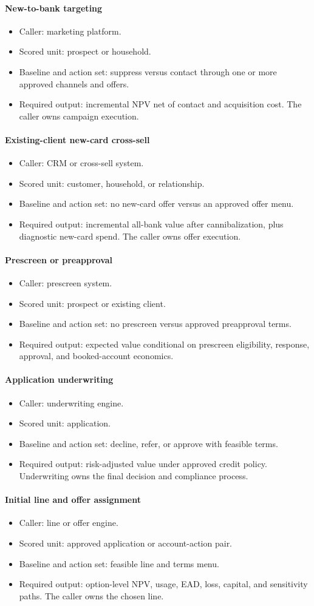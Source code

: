 \documentclass[11pt]{article}
\newcommand{\1}{\mathbf{1}}
\newcommand{\contractitem}[2]{\paragraph{#1}\begin{itemize}[leftmargin=1.5em,itemsep=0.12em,topsep=0.18em]#2\end{itemize}}
\begin{document}
\contractitem{New-to-bank targeting}{
  \item Caller: marketing platform.
  \item Scored unit: prospect or household.
  \item Baseline and action set: suppress versus contact through one or more
        approved channels and offers.
  \item Required output: incremental NPV net of contact and acquisition cost.
        The caller owns campaign execution.
}
\contractitem{Existing-client new-card cross-sell}{
  \item Caller: CRM or cross-sell system.
  \item Scored unit: customer, household, or relationship.
  \item Baseline and action set: no new-card offer versus an approved offer
        menu.
  \item Required output: incremental all-bank value after cannibalization, plus
        diagnostic new-card spend. The caller owns offer execution.
}
\contractitem{Prescreen or preapproval}{
  \item Caller: prescreen system.
  \item Scored unit: prospect or existing client.
  \item Baseline and action set: no prescreen versus approved preapproval
        terms.
  \item Required output: expected value conditional on prescreen eligibility,
        response, approval, and booked-account economics.
}
\contractitem{Application underwriting}{
  \item Caller: underwriting engine.
  \item Scored unit: application.
  \item Baseline and action set: decline, refer, or approve with feasible
        terms.
  \item Required output: risk-adjusted value under approved credit policy.
        Underwriting owns the final decision and compliance process.
}
\contractitem{Initial line and offer assignment}{
  \item Caller: line or offer engine.
  \item Scored unit: approved application or account-action pair.
  \item Baseline and action set: feasible line and terms menu.
  \item Required output: option-level NPV, usage, EAD, loss, capital, and
        sensitivity paths. The caller owns the chosen line.
}
\end{document}

